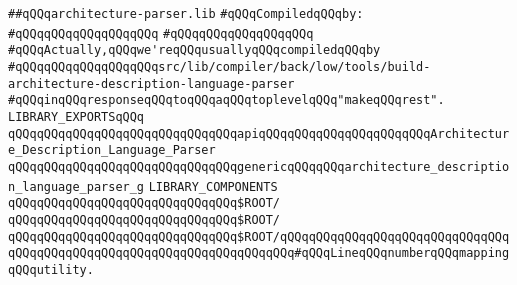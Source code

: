 \label{src/lib/compiler/back/low/tools/architecture-parser.lib}
\verb|##qQQqarchitecture-parser.lib|\newline
\newline
\verb|#qQQqCompiledqQQqby:|\newline
\verb|#qQQqqQQqqQQqqQQqqQQq|\newline
\verb|#qQQqqQQqqQQqqQQqqQQq|\newline
\newline
\verb|#qQQqActually,qQQqwe'reqQQqusuallyqQQqcompiledqQQqby|\newline
\verb|#qQQqqQQqqQQqqQQqqQQqsrc/lib/compiler/back/low/tools/build-architecture-description-language-parser|\newline
\verb|#qQQqinqQQqresponseqQQqtoqQQqaqQQqtoplevelqQQq"makeqQQqrest".|\newline
\newline
\verb|LIBRARY_EXPORTSqQQq|\newline
\newline
\verb|qQQqqQQqqQQqqQQqqQQqqQQqqQQqqQQqapiqQQqqQQqqQQqqQQqqQQqqQQqArchitecture_Description_Language_Parser|\newline
\verb|qQQqqQQqqQQqqQQqqQQqqQQqqQQqqQQqgenericqQQqqQQqarchitecture_description_language_parser_g|\newline
\newline
\newline
\newline
\verb|LIBRARY_COMPONENTS|\newline
\newline
\verb|qQQqqQQqqQQqqQQqqQQqqQQqqQQqqQQq$ROOT/|\newline
\newline
\verb|qQQqqQQqqQQqqQQqqQQqqQQqqQQqqQQq$ROOT/|\newline
\newline
\verb|qQQqqQQqqQQqqQQqqQQqqQQqqQQqqQQq$ROOT/|\verb|qQQqqQQqqQQqqQQqqQQqqQQqqQQqqQQqqQQqqQQqqQQqqQQqqQQqqQQqqQQqqQQqqQQqqQQq#qQQqLineqQQqnumberqQQqmappingqQQqutility.|\newline
